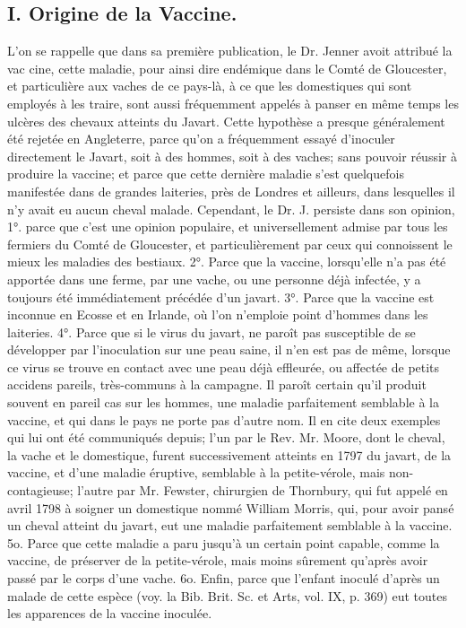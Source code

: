 \subsection{I. Origine de la Vaccine.}
L'on se rappelle que dans sa première publication, le Dr. Jenner avoit attribué la vac cine,\setcounter{page}{266} cette maladie, pour ainsi dire endémique dans le Comté de Gloucester, et particulière aux vaches de ce pays-là, à ce que les domestiques qui sont employés à les traire, sont aussi fréquemment appelés à panser en même temps les ulcères des chevaux atteints du Javart. Cette hypothèse a presque généralement été rejetée en Angleterre, parce qu'on a fréquemment essayé d'inoculer directement le Javart, soit à des hommes, soit à des vaches; sans pouvoir réussir à produire la vaccine; et parce que cette dernière maladie s'est quelquefois manifestée dans de grandes laiteries, près de Londres et ailleurs, dans lesquelles il n'y avait eu aucun cheval malade. Cependant, le Dr. J. persiste dans son opinion, 1°. parce que c'est une opinion populaire, et universellement admise par tous les fermiers du Comté de Gloucester, et particulièrement par ceux qui connoissent le mieux les maladies des bestiaux. 2°. Parce que la vaccine, lorsqu'elle n'a pas été apportée dans une ferme, par une vache, ou une personne déjà infectée, y a toujours été immédiatement précédée d'un javart. 3°. Parce que la vaccine est inconnue en Ecosse et en Irlande, où l'on n'emploie point d'hommes dans les laiteries. 4°. Parce que si le virus du javart, ne paroît pas susceptible de se développer\setcounter{page}{267} par l'inoculation sur une peau saine, il n'en est pas de même, lorsque ce virus se trouve en contact avec une peau déjà effleurée, ou affectée de petits accidens pareils, très-communs à la campagne. Il paroît certain qu'il produit souvent en pareil cas sur les hommes, une maladie parfaitement semblable à la vaccine, et qui dans le pays ne porte pas d'autre nom. Il en cite deux exemples qui lui ont été communiqués depuis; l'un par le Rev. Mr. Moore, dont le cheval, la vache et le domestique, furent successivement atteints en 1797 du javart, de la vaccine, et d'une maladie éruptive, semblable à la petite-vérole, mais non-contagieuse; l'autre par Mr. Fewster, chirurgien de Thornbury, qui fut appelé en avril 1798 à soigner un domestique nommé William Morris, qui, pour avoir pansé un cheval atteint du javart, eut une maladie parfaitement semblable à la vaccine. 5o. Parce que cette maladie a paru jusqu'à un certain point capable, comme la vaccine, de préserver de la petite-vérole, mais moins sûrement qu'après avoir passé par le corps d'une vache. 6o. Enfin, parce que l'enfant inoculé d'après un malade de cette espèce (voy. la Bib. Brit. Sc. et Arts, vol. IX, p. 369) eut toutes les apparences de la vaccine inoculée.
\setcounter{page}{268}
